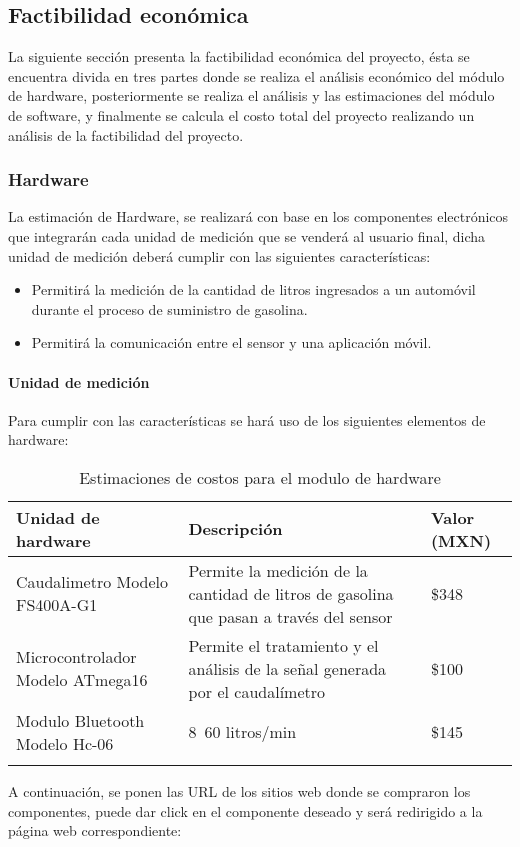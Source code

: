 \subsection{Factibilidad económica}
La siguiente sección presenta la factibilidad económica del proyecto, ésta se encuentra divida en tres partes donde se realiza el análisis económico del módulo de hardware, posteriormente se realiza el análisis y las estimaciones del módulo de software, y finalmente se calcula el costo total del proyecto realizando un análisis de la factibilidad del proyecto.

\subsubsection{Hardware}
La estimación de Hardware, se realizará con base en los componentes electrónicos que integrarán cada unidad de medición que se venderá al usuario final, dicha unidad de medición deberá cumplir con las siguientes características:
\begin{itemize}
	\item Permitirá la medición de la cantidad de litros ingresados a un automóvil durante el proceso de suministro de gasolina.
	\item Permitirá la comunicación entre el sensor y una aplicación móvil.
\end{itemize}

\paragraph{Unidad de medición} Para cumplir con las características se hará uso de los siguientes elementos de hardware:

\begin{longtable}{|M{4cm}|M{6.5cm}|M{4cm}|}
	\hline
	\textbf{Unidad de hardware} & \textbf{Descripción} &\textbf{Valor (MXN)}
	\\\hline
	Caudalimetro Modelo FS400A-G1 & Permite la medición de la cantidad de litros de gasolina que pasan a través del sensor & \$348
	\\\hline
	Microcontrolador Modelo ATmega16 & Permite el tratamiento y el análisis de la señal generada por el caudalímetro & \$100
	\\\hline
	Modulo Bluetooth Modelo Hc-06  & 8~60 litros/min & \$145
	\\\hline
	\caption{Estimaciones de costos para el modulo de hardware}
	\label{tabla_fatibilidad_economica} 
\end{longtable}
A continuación, se ponen las URL de los sitios web donde se compraron los componentes, puede dar click en el componente deseado y será redirigido a la página web correspondiente:

